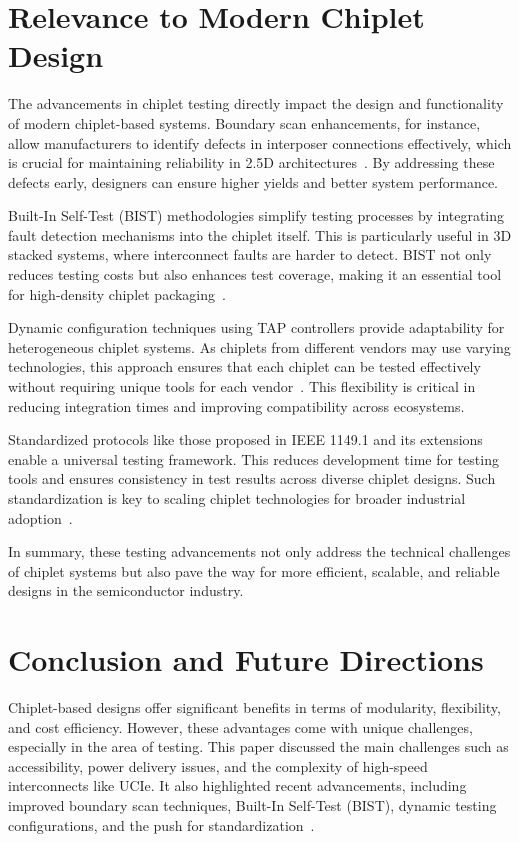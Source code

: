 \documentclass[acmtog, 12pt]{acmart}
\begin{document}
\section*{Relevance to Modern Chiplet Design}

The advancements in chiplet testing directly impact the design and functionality of modern chiplet-based systems. Boundary scan enhancements, for instance, allow manufacturers to identify defects in interposer connections effectively, which is crucial for maintaining reliability in 2.5D architectures~\cite{10365967}. By addressing these defects early, designers can ensure higher yields and better system performance.

Built-In Self-Test (BIST) methodologies simplify testing processes by integrating fault detection mechanisms into the chiplet itself. This is particularly useful in 3D stacked systems, where interconnect faults are harder to detect. BIST not only reduces testing costs but also enhances test coverage, making it an essential tool for high-density chiplet packaging~\cite{10766679}.

Dynamic configuration techniques using TAP controllers provide adaptability for heterogeneous chiplet systems. As chiplets from different vendors may use varying technologies, this approach ensures that each chiplet can be tested effectively without requiring unique tools for each vendor~\cite{9824550}. This flexibility is critical in reducing integration times and improving compatibility across ecosystems.

Standardized protocols like those proposed in IEEE 1149.1 and its extensions enable a universal testing framework. This reduces development time for testing tools and ensures consistency in test results across diverse chiplet designs. Such standardization is key to scaling chiplet technologies for broader industrial adoption~\cite{6515989}.

In summary, these testing advancements not only address the technical challenges of chiplet systems but also pave the way for more efficient, scalable, and reliable designs in the semiconductor industry.


\section*{Conclusion and Future Directions}

Chiplet-based designs offer significant benefits in terms of modularity, flexibility, and cost efficiency. However, these advantages come with unique challenges, especially in the area of testing. This paper discussed the main challenges such as accessibility, power delivery issues, and the complexity of high-speed interconnects like UCIe. It also highlighted recent advancements, including improved boundary scan techniques, Built-In Self-Test (BIST), dynamic testing configurations, and the push for standardization~\cite{10365967, 10766679, 9824550, 6515989}.
\end{document}
